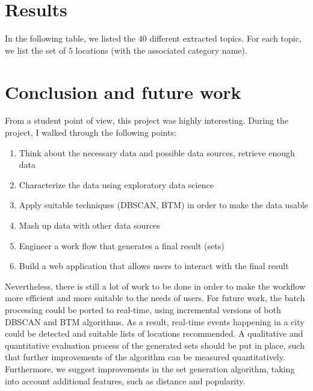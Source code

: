 \section{Results}

In the following table, we listed the $40$ different extracted topics. For each topic, we list the set of $5$ locations (with the associated category name). 

\section{Conclusion and future work}

From a student point of view, this project was highly interesting. During the project, I walked through the following points:
\begin{enumerate}
  \item Think about the necessary data and possible data sources, retrieve enough data
  \item Characterize the data using exploratory data science
  \item Apply suitable techniques (DBSCAN, BTM) in order to make the data usable
  \item Mash up data with other data sources
  \item Engineer a work flow that generates a final result (sets)
  \item Build a web application that allows users to interact with the final result 
\end{enumerate}
Nevertheless, there is still a lot of work to be done in order to make the workflow more efficient and more suitable to the needs of users. For future work, the batch processing could be ported to real-time, using incremental versions of both DBSCAN and BTM algorithms. As a result, real-time events happening in a city could be detected and suitable lists of locations recommended. A qualitative and quantitative evaluation process of the generated sets should be put in place, such that further improvements of the algorithm can be measured quantitatively. Furthermore, we suggest improvements in the set generation algorithm, taking into account additional features, such as distance and popularity.

\newpage
\nocite{*} 


 



\appendix

